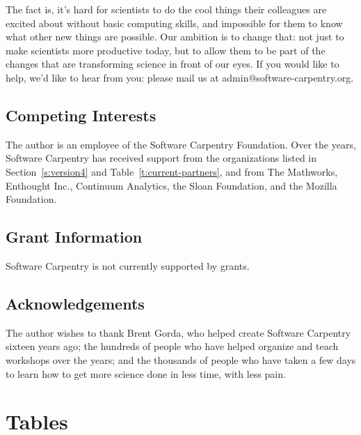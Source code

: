 \documentclass[10pt,a4paper,twocolumn]{article}
\begin{document}
The fact is, it's hard for scientists to do the cool things their
colleagues are excited about without basic computing skills, and
impossible for them to know what other new things are possible. Our
ambition is to change that: not just to make scientists more productive
today, but to allow them to be part of the changes that are transforming
science in front of our eyes. If you would like to help, we'd like to
hear from you: please mail us at admin@software-carpentry.org.

\subsection{Competing Interests}

The author is an employee of the Software Carpentry Foundation. Over
the years, Software Carpentry has received support from the
organizations listed in Section~\ref{s:version4} and
Table~\ref{t:current-partners}, and from The Mathworks, Enthought
Inc., Continuum Analytics, the Sloan Foundation, and the Mozilla
Foundation.

\subsection{Grant Information}

Software Carpentry is not currently supported by grants.

\subsection{Acknowledgements}

The author wishes to thank Brent Gorda, who helped create Software
Carpentry sixteen years ago; the hundreds of people who have helped
organize and teach workshops over the years; and the thousands of
people who have taken a few days to learn how to get more science
done in less time, with less pain.

\section{Tables}
\end{document}
